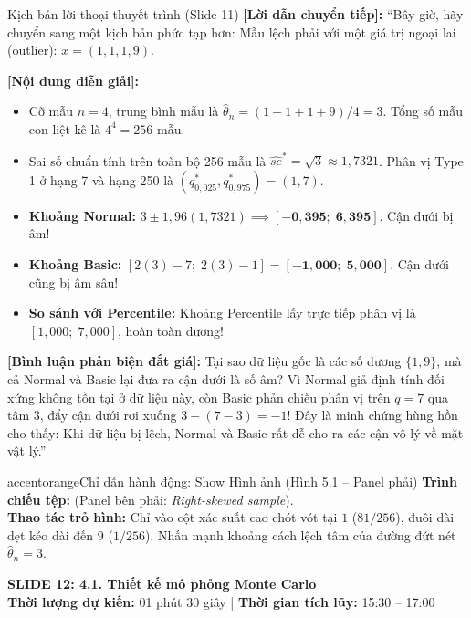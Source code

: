 \documentclass[10pt,a4paper]{article}
\newcommand{\slideheader}[4]{
    \vspace{0.4cm}
    \begin{tcolorbox}[colback=primary!7!white, colframe=primary, arc=2mm, boxrule=1pt, left=4mm, right=4mm, top=2.5mm, bottom=2.5mm]
        {\Large\bfseries\color{primary} SLIDE #1: #2}\\[0.1cm]
        {\small\textbf{Thời lượng dự kiến:} #3 \quad | \quad \textbf{Thời gian tích lũy:} #4}
    \end{tcolorbox}
    \vspace{0.15cm}
}
\begin{document}
\begin{scriptbox}{Kịch bản lời thoại thuyết trình (Slide 11)}
    \textbf{[Lời dẫn chuyển tiếp]:} ``Bây giờ, hãy chuyển sang một kịch bản phức tạp hơn: Mẫu lệch phải với một giá trị ngoại lai (outlier): $x = (1, 1, 1, 9)$.
    
    \textbf{[Nội dung diễn giải]:} 
    \begin{itemize}
        \item Cỡ mẫu $n=4$, trung bình mẫu là $\hat\theta_n = (1+1+1+9)/4 = 3$. Tổng số mẫu con liệt kê là $4^4 = 256$ mẫu.
        \item Sai số chuẩn tính trên toàn bộ 256 mẫu là $\widehat{se}^* = \sqrt{3} \approx 1{,}7321$. Phân vị Type 1 ở hạng 7 và hạng 250 là $(q_{0{,}025}^*, q_{0{,}975}^*) = (1, 7)$.
        \item \textbf{Khoảng Normal:} $3 \pm 1{,}96(1{,}7321) \implies \mathbf{[-0{,}395;\; 6{,}395]}$. Cận dưới bị âm!
        \item \textbf{Khoảng Basic:} $[2(3) - 7;\; 2(3) - 1] = \mathbf{[-1{,}000;\; 5{,}000]}$. Cận dưới cũng bị âm sâu!
        \item \textbf{So sánh với Percentile:} Khoảng Percentile lấy trực tiếp phân vị là $[1{,}000;\; 7{,}000]$, hoàn toàn dương!
    \end{itemize}
    \textbf{[Bình luận phản biện đắt giá]:} Tại sao dữ liệu gốc là các số dương $\{1, 9\}$, mà cả Normal và Basic lại đưa ra cận dưới là số âm? Vì Normal giả định tính đối xứng không tồn tại ở dữ liệu này, còn Basic phản chiếu phân vị trên $q=7$ qua tâm $3$, đẩy cận dưới rơi xuống $3 - (7 - 3) = -1$! Đây là minh chứng hùng hồn cho thấy: Khi dữ liệu bị lệch, Normal và Basic rất dễ cho ra các cận vô lý về mặt vật lý.''
\end{scriptbox}

\begin{actionbox}{accentorange}{Chỉ dẫn hành động: Show Hình ảnh (Hình 5.1 -- Panel phải)}
    \textbf{Trình chiếu tệp:}  (Panel bên phải: \textit{Right-skewed sample}).\\
    \textbf{Thao tác trỏ hình:} Chỉ vào cột xác suất cao chót vót tại $1$ ($81/256$), đuôi dài dẹt kéo dài đến $9$ ($1/256$). Nhấn mạnh khoảng cách lệch tâm của đường đứt nét $\hat\theta_n=3$.
\end{actionbox}

\newpage

\slideheader{12}{4.1. Thiết kế mô phỏng Monte Carlo}{01 phút 30 giây}{15:30 -- 17:00}
\end{document}
